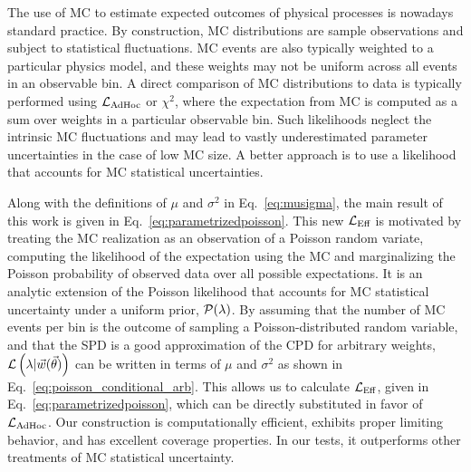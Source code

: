 The use of MC to estimate expected outcomes of physical processes is nowadays standard practice. By construction, MC distributions are sample observations and subject to statistical fluctuations. MC events are also typically weighted to a particular physics model, and these weights may not be uniform across all events in an observable bin.
A direct comparison of MC distributions to data is typically performed using $\mathcal{L}_{\textmd{AdHoc}}$ or $\chi^2$, where the expectation from MC is computed as a sum over weights in a particular observable bin. Such likelihoods neglect the intrinsic MC fluctuations and may lead to vastly underestimated parameter uncertainties in the case of low MC size. A better approach is to use a likelihood that accounts for MC statistical uncertainties.

Along with the definitions of $\mu$ and $\sigma^2$ in Eq.~\eqref{eq:musigma}, the main result of this work is given in Eq.~\eqref{eq:parametrizedpoisson}. This new $\mathcal{L}_\textmd{Eff}$ is motivated by treating the MC realization as an observation of a Poisson random variate, computing the likelihood of the expectation using the MC and marginalizing the Poisson probability of observed data over all possible expectations. It is an analytic extension of the Poisson likelihood that accounts for MC statistical uncertainty under a uniform prior, $\mathcal{P}(\lambda)$. By assuming that the number of MC events per bin is the outcome of sampling a Poisson-distributed random variable, and that the SPD is a good approximation of the CPD for arbitrary weights, $\mathcal{L} \left(\lambda|\vec{w}(\vec{\theta})\right)$ can be written in terms of $\mu$ and $\sigma^2$ as shown in Eq.~\eqref{eq:poisson_conditional_arb}. This allows us to calculate $\mathcal{L}_\textmd{Eff}$, given in Eq.~\eqref{eq:parametrizedpoisson}, which can be directly substituted in favor of $\mathcal{L}_{\textmd{AdHoc}}$. Our construction is computationally efficient, exhibits proper limiting behavior, and has excellent coverage properties. In our tests, it outperforms other treatments of MC statistical uncertainty.
